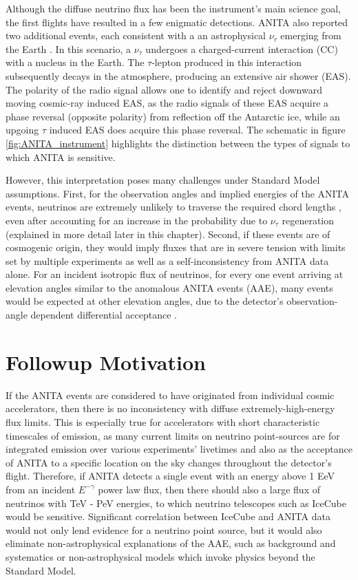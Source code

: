 Although the diffuse neutrino flux has been the instrument's main science goal, the first flights have resulted in a few enigmatic detections. ANITA also reported two additional events, each consistent with a an astrophysical $\nu_{\tau}$ emerging from the Earth \citep{Feng:2001ue, Gorham:2016zah, Gorham:2018ydl}. In this scenario, a $\nu_{\tau}$ undergoes a charged-current interaction (CC) with a nucleus in the Earth. The $\tau$-lepton produced in this interaction subsequently decays in the atmosphere, producing an extensive air shower (EAS). The polarity of the radio signal allows one to identify and reject downward moving cosmic-ray induced EAS, as the radio signals of these EAS acquire a phase reversal (opposite polarity) from reflection off the Antarctic ice, while an upgoing $\tau$ induced EAS does acquire this phase reversal. The schematic in figure \ref{fig:ANITA_instrument} highlights the distinction between the types of signals to which ANITA is sensitive. 

However, this interpretation poses many challenges  under Standard Model assumptions. First, for the observation angles and implied energies of the ANITA events, neutrinos are extremely unlikely to traverse the required chord lengths \citep{Gorham:2016zah}, even after accounting for an increase in the probability due to $\nu_{\tau}$ regeneration (explained in more detail later in this chapter). Second, if these events are of cosmogenic origin, they would imply fluxes that are in severe tension with limits set by multiple experiments \citep{Aab:2015kma, Zas:2017xdj, Aartsen:2016ngq} as well as a self-inconsistency from ANITA data alone. For an incident isotropic flux of neutrinos, for every one event arriving at elevation angles similar to the anomalous ANITA events (AAE), many events would be expected at other elevation angles, due to the detector's observation-angle dependent differential acceptance \citep{Romero-Wolf:2018zxt}.

\section{Followup Motivation}
\label{sec:ANITA_followup}
If the ANITA events are considered to have originated from individual cosmic accelerators, then there is no inconsistency with diffuse extremely-high-energy flux limits. This is especially true for accelerators with short characteristic timescales of emission, as many current limits on neutrino point-sources are for integrated emission over various experiments' livetimes \citep{Aartsen:2018ywr} and also as the acceptance of ANITA to a specific location on the sky changes throughout the detector's flight. Therefore, if ANITA detects a single event with an energy above 1 EeV from an incident $E^{-\gamma}$ power law flux, then there should also a large flux of neutrinos with TeV - PeV energies, to which neutrino telescopes such as IceCube would be sensitive. Significant correlation between IceCube and ANITA data would not only lend evidence for a neutrino point source, but it would also eliminate non-astrophysical explanations of the AAE, such as background and systematics or non-astrophysical models which invoke physics beyond the Standard Model.


